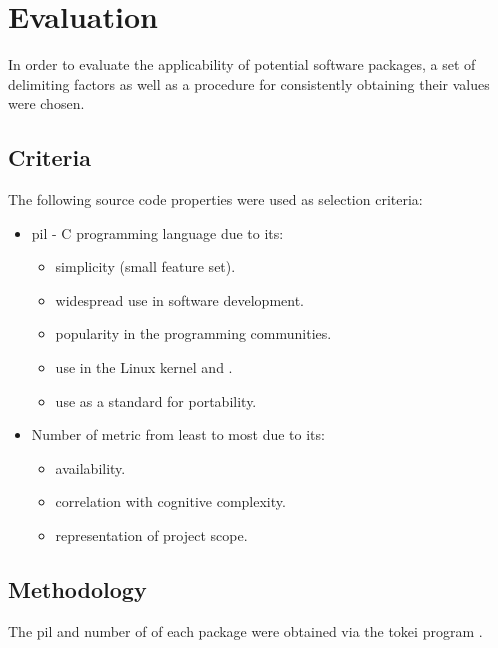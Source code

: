 \section{Evaluation}\label{Evaluation}

In order to evaluate the applicability of potential software packages, a set of delimiting factors as well as a procedure for consistently obtaining their values were chosen.

\subsection{Criteria}

The following source code properties were used as selection criteria:

\begin{itemize}
    \item \Gls{pil} - C programming language due to its:
    \begin{itemize}
        \item simplicity (small feature set).
        \item widespread use in software development.
        \item popularity in the programming communities.
        \item use in the Linux kernel and .
        \item use as a standard for  portability.
    \end{itemize}
    \item Number of  metric from least to most due to its:
    \begin{itemize}
        \item availability.
        \item correlation with cognitive complexity.
        \item representation of project scope.
    \end{itemize}
\end{itemize}

\subsection{Methodology}

The \gls{pil} and number of  of each package were obtained via the tokei program \cite{tokei}.
